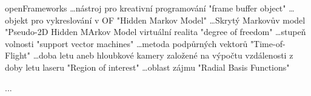 
\abbrv[OF]	openFrameworks \dots nástroj pro kreativní programování
\abbrv[FBO]  "frame buffer object" \dots objekt pro vykreslování v OF
\abbrv[HMM]  "Hidden Markov Model" \dots Skrytý Markovův model
\abbrv[P2DHMM]  "Pseudo-2D Hidden MArkov Model
\abbrv[VR]  virtuální realita
\abbrv[DOF]  "degree of freedom" \dots stupeň volnosti
\abbrv[SVM]  "support vector machines" \dots metoda podpůrných vektorů
\abbrv[ToF]  "Time-of-Flight" \dots doba letu aneb hloubkové kamery založené na výpočtu vzdálenosti z doby letu laseru
\abbrv[ROI]  "Region of interest" \dots oblast zájmu
\abbrv[RBF]  "Radial Basis Functions"

\abbrv[...]     ...
\stopAbbreviations

\endinput

